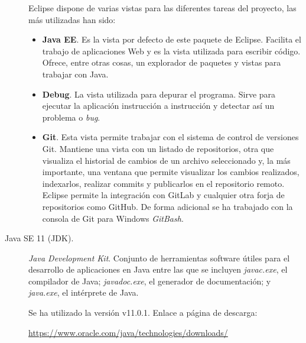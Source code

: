 \begin{description}
		Eclipse dispone de varias vistas para las diferentes tareas del proyecto, las más utilizadas han sido:
		\begin{itemize}
			\item \textbf{Java EE}. Es la vista por defecto de este paquete de Eclipse. Facilita el trabajo de aplicaciones Web y es la vista utilizada para escribir código. Ofrece, entre otras cosas, un explorador de paquetes y vistas para trabajar con Java.
			\item \textbf{Debug}. La vista utilizada para depurar el programa. Sirve para ejecutar la aplicación instrucción a instrucción y detectar así un problema o \textit{bug}.
			\item \textbf{Git}. Esta vista permite trabajar con el sistema de control de versiones Git. Mantiene una vista con un listado de repositorios, otra que visualiza el historial de cambios de un archivo seleccionado y, la más importante, una ventana que permite visualizar los cambios realizados, indexarlos, realizar commits y publicarlos en el repositorio remoto. Eclipse permite la integración con GitLab y cualquier otra forja de repositorios como GitHub.
			De forma adicional se ha trabajado con la consola de Git para Windows \textit{GitBash}.
		\end{itemize}
		
	\item[Java SE 11 (JDK).] \textit{Java Development Kit}. Conjunto de herramientas software útiles para el desarrollo de aplicaciones en Java entre las que se incluyen \textit{javac.exe}, el compilador de Java; \textit{javadoc.exe}, el generador de documentación; y \textit{java.exe}, el intérprete de Java.
	
		Se ha utilizado la versión  v11.0.1. Enlace a página de descarga:
		
		\url{https://www.oracle.com/java/technologies/downloads/}
	

\end{description}
